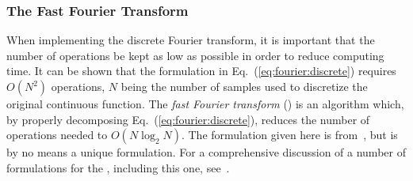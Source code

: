 \subsubsection{The Fast Fourier Transform}

When implementing the discrete Fourier transform, it is important that
the number of operations be kept as low as possible in order to
reduce computing time.  It can be shown that the formulation in
Eq.~(\ref{eq:fourier:discrete}) requires $O(N^{2})$ operations, $N$
being the number of samples used to discretize the original continuous
function.  The {\em fast Fourier transform\/} ({\fft}) is an algorithm
which, by properly decomposing Eq.~(\ref{eq:fourier:discrete}),
reduces the number of operations needed to $O(N\log_{2}N)$.  The
formulation given here is from~\cite{digim}, but is by no means a
unique formulation.  For a comprehensive discussion of a number of
formulations for the {\fft}, including this one, see~\cite{brigham}.

